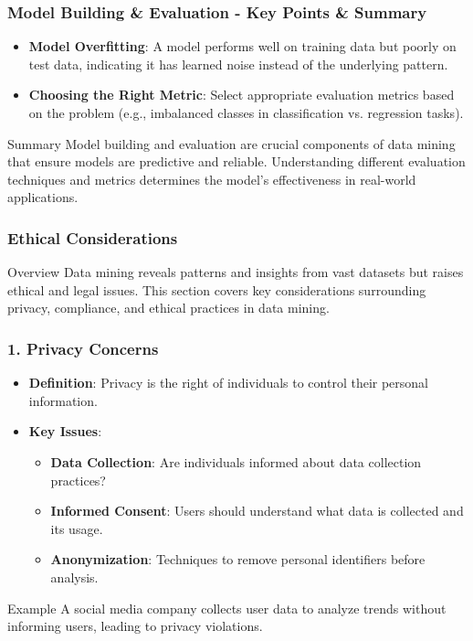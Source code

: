 \documentclass{beamer}
\begin{document}
\begin{frame}[fragile]
    \frametitle{Model Building \& Evaluation - Key Points & Summary}
    \begin{itemize}
        \item \textbf{Model Overfitting}: A model performs well on training data but poorly on test data, indicating it has learned noise instead of the underlying pattern.
        \item \textbf{Choosing the Right Metric}: Select appropriate evaluation metrics based on the problem (e.g., imbalanced classes in classification vs. regression tasks).
    \end{itemize}
    
    \begin{block}{Summary}
        Model building and evaluation are crucial components of data mining that ensure models are predictive and reliable.
        Understanding different evaluation techniques and metrics determines the model's effectiveness in real-world applications.
    \end{block}
\end{frame}

\begin{frame}[fragile]
    \frametitle{Ethical Considerations}
    \begin{block}{Overview}
        Data mining reveals patterns and insights from vast datasets but raises ethical and legal issues. This section covers key considerations surrounding privacy, compliance, and ethical practices in data mining.
    \end{block}
\end{frame}

\begin{frame}[fragile]
    \frametitle{1. Privacy Concerns}
    \begin{itemize}
        \item \textbf{Definition}: Privacy is the right of individuals to control their personal information.
        \item \textbf{Key Issues}:
        \begin{itemize}
            \item \textbf{Data Collection}: Are individuals informed about data collection practices?
            \item \textbf{Informed Consent}: Users should understand what data is collected and its usage.
            \item \textbf{Anonymization}: Techniques to remove personal identifiers before analysis.
        \end{itemize}
    \end{itemize}
    \begin{block}{Example}
        A social media company collects user data to analyze trends without informing users, leading to privacy violations.
    \end{block}
\end{frame}
\end{document}

